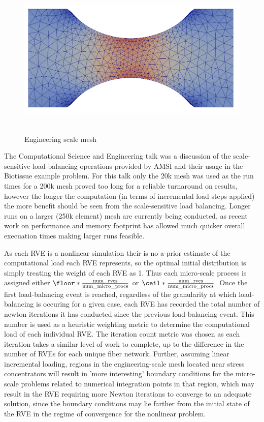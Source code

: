 \begin{figure}
  \begin{center}
    \includegraphics[height=3in]{dogBone14k.png}
  \end{center}
  \caption{\small Engineering scale mesh}
  \label{dogbone_mesh}
\end{figure}

The Computational Science and Engineering talk \cite{wtobin2015cse} was a discussion of the scale-sensitive load-balancing operations provided by AMSI and their usage in the Biotissue example problem. For this talk only the 20k mesh was used as the run times for a 200k mesh proved too long for a reliable turnaround on results, however the longer the computation (in terms of incremental load steps applied) the more benefit should be seen from the scale-sensitive load balancing. Longer runs on a larger (250k element) mesh are currently being conducted, as recent work on performance and memory footprint has allowed much quicker overall execuation times making larger runs feasible.

As each RVE is a nonlinear simulation their is no a-prior estimate of the computational load each RVE represents, so the optimal initial distribution is simply treating the weight of each RVE as 1. Thus each micro-scale process is assigned either $ \floor*{\frac{\text{num\_rves}}{\text{num\_micro\_procs}}} $ or $ \ceil*{\frac{\text{num\_rves}}{\text{num\_micro\_procs}}} $. Once the first load-balancing event is reached, regardless of the granularity at which load-balancing is occuring for a given case, each RVE has recorded the total number of newton iterations it has conducted since the previous load-balancing event. This number is used as a heuristic weighting metric to determine the computational load of each individual RVE. The iteration count metric was chosen as each iteration takes a similar level of work to complete, up to the difference in the number of RVEs for each unique fiber network. Further, assuming linear incremental loading, regions in the engineering-scale mesh located near stress concentrators will result in 'more interesting' boundary conditions for the micro-scale problems related to numerical integration points in that region, which may result in the RVE requiring more Newton iterations to converge to an adequate solution, since the boundary conditions may lie farther from the initial state of the RVE in the regime of convergence for the nonlinear problem.

